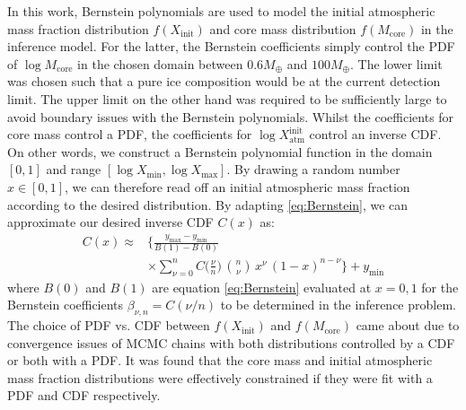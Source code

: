 \documentclass[fleqn,usenatbib]{mnras}
\begin{document}
In this work, Bernstein polynomials are used to model the initial atmospheric mass fraction distribution $f(X_\text{init})$ and core mass distribution $f(M_\text{core})$ in the inference model. For the latter, the Bernstein coefficients simply control the PDF of $\log M_\text{core}$ in the chosen domain between $0.6 M_\oplus$ and $100 M_\oplus$. The lower limit was chosen such that a pure ice composition would be at the current detection limit. The upper limit on the other hand was required to be sufficiently large to avoid boundary issues with the Bernstein polynomials. Whilst the coefficients for core mass control a PDF, the coefficients for $\log X^\text{init}_\text{atm}$ control an inverse CDF. On other words, we construct a Bernstein polynomial function in the domain $[0,1]$ and range $[\log X_\text{min}, \log X_\text{max}]$. By drawing a random number $x \in [0,1]$, we can therefore read off an initial atmospheric mass fraction according to the desired distribution. By adapting \ref{eq:Bernstein}, we can approximate our desired inverse CDF $C(x)$ as:
\begin{equation} 
    \begin{split}
        C(x) \approx  & \bigg\{ \frac{y_\text{max}-y_\text{min}}{B(1) - B(0)}  \\ & \times \sum^n_{\nu=0} C \bigg ( \frac{\nu}{n} \bigg) \, \binom n \nu \, x^\nu \, (1-x)^{n-\nu} \bigg\} + y_\text{min}
    \end{split}
\end{equation}
where $B(0)$ and $B(1)$ are equation \ref{eq:Bernstein} evaluated at $x=0,1$ for the Bernstein coefficients $\beta_{\nu,n} = C(\nu / n)$ to be determined in the inference problem. The choice of PDF vs. CDF between $f(X_\text{init})$ and $f(M_\text{core})$ came about due to convergence issues of MCMC chains with both distributions controlled by a CDF or both with a PDF. It was found that the core mass and initial atmospheric mass fraction distributions were effectively constrained if they were fit with a PDF and CDF respectively.
\end{document}

